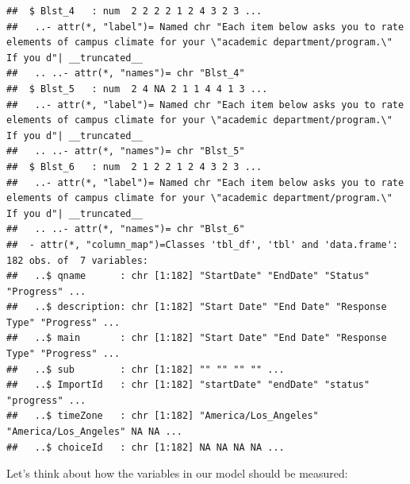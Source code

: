 \documentclass[
  11pt,
]{book}
\begin{document}
\begin{verbatim}
##  $ Blst_4   : num  2 2 2 2 1 2 4 3 2 3 ...
##   ..- attr(*, "label")= Named chr "Each item below asks you to rate elements of campus climate for your \"academic department/program.\"  If you d"| __truncated__
##   .. ..- attr(*, "names")= chr "Blst_4"
##  $ Blst_5   : num  2 4 NA 2 1 1 4 4 1 3 ...
##   ..- attr(*, "label")= Named chr "Each item below asks you to rate elements of campus climate for your \"academic department/program.\"  If you d"| __truncated__
##   .. ..- attr(*, "names")= chr "Blst_5"
##  $ Blst_6   : num  2 1 2 2 1 2 4 3 2 3 ...
##   ..- attr(*, "label")= Named chr "Each item below asks you to rate elements of campus climate for your \"academic department/program.\"  If you d"| __truncated__
##   .. ..- attr(*, "names")= chr "Blst_6"
##  - attr(*, "column_map")=Classes 'tbl_df', 'tbl' and 'data.frame':   182 obs. of  7 variables:
##   ..$ qname      : chr [1:182] "StartDate" "EndDate" "Status" "Progress" ...
##   ..$ description: chr [1:182] "Start Date" "End Date" "Response Type" "Progress" ...
##   ..$ main       : chr [1:182] "Start Date" "End Date" "Response Type" "Progress" ...
##   ..$ sub        : chr [1:182] "" "" "" "" ...
##   ..$ ImportId   : chr [1:182] "startDate" "endDate" "status" "progress" ...
##   ..$ timeZone   : chr [1:182] "America/Los_Angeles" "America/Los_Angeles" NA NA ...
##   ..$ choiceId   : chr [1:182] NA NA NA NA ...
\end{verbatim}

Let's think about how the variables in our model should be measured:
\end{document}
